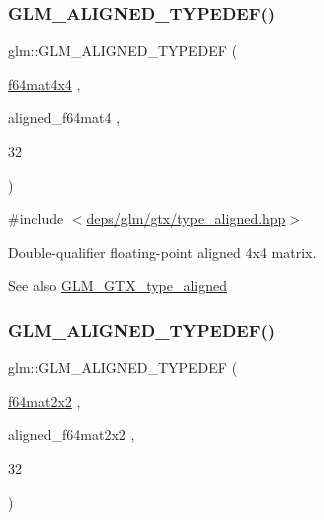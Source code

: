 \subsubsection{\texorpdfstring{G\+L\+M\+\_\+\+A\+L\+I\+G\+N\+E\+D\+\_\+\+T\+Y\+P\+E\+D\+E\+F()}{GLM\_ALIGNED\_TYPEDEF()}\hspace{0.1cm}{\footnotesize\ttfamily [195/209]}}
{\footnotesize\ttfamily glm\+::\+G\+L\+M\+\_\+\+A\+L\+I\+G\+N\+E\+D\+\_\+\+T\+Y\+P\+E\+D\+EF (\begin{DoxyParamCaption}\item[{\hyperlink{group__gtc__type__precision_ga5fc21633b1546e4599609c47b4c8dac4}{f64mat4x4}}]{,  }\item[{aligned\+\_\+f64mat4}]{,  }\item[{32}]{ }\end{DoxyParamCaption})}



{\ttfamily \#include $<$\hyperlink{gtx_2type__aligned_8hpp}{deps/glm/gtx/type\+\_\+aligned.\+hpp}$>$}

Double-\/qualifier floating-\/point aligned 4x4 matrix. \begin{DoxySeeAlso}{See also}
\hyperlink{group__gtx__type__aligned}{G\+L\+M\+\_\+\+G\+T\+X\+\_\+type\+\_\+aligned} 
\end{DoxySeeAlso}
\mbox{\label{group__gtx__type__aligned_gadbd2c639c03de1c3e9591b5a39f65559}} 
\subsubsection{\texorpdfstring{G\+L\+M\+\_\+\+A\+L\+I\+G\+N\+E\+D\+\_\+\+T\+Y\+P\+E\+D\+E\+F()}{GLM\_ALIGNED\_TYPEDEF()}\hspace{0.1cm}{\footnotesize\ttfamily [196/209]}}
{\footnotesize\ttfamily glm\+::\+G\+L\+M\+\_\+\+A\+L\+I\+G\+N\+E\+D\+\_\+\+T\+Y\+P\+E\+D\+EF (\begin{DoxyParamCaption}\item[{\hyperlink{group__gtc__type__precision_gae18de078e2885803ceda215c6e04a08a}{f64mat2x2}}]{,  }\item[{aligned\+\_\+f64mat2x2}]{,  }\item[{32}]{ }\end{DoxyParamCaption})}



